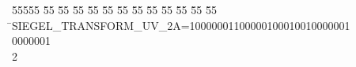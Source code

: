 %
%
\begin{tabbing}
55555 \= 55 \= 55 \= 55 \= 55 \= 55 \= 55 \= 55 \= 55 \= 55 \= 55 \= 55 \= 55 \= \>SIEGEL\_TRANSFORM\_UV\_2A=10000001100000100010010000001\\[0pt]
\>0000001\\[0pt]
2\>\end{tabbing}
